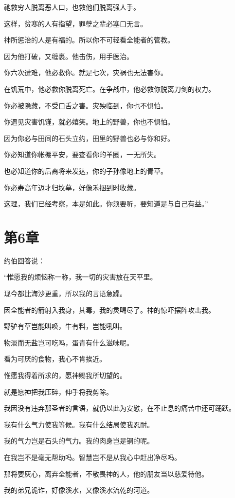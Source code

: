 \documentclass[12pt,oneside]{book}
\begin{document}
祂救穷人脱离恶人口，也救他们脱离强人手。

这样，贫寒的人有指望，罪孽之辈必塞口无言。

神所惩治的人是有福的。所以你不可轻看全能者的管教。

因为他打破，又缠裹。他击伤，用手医治。

你六次遭难，他必救你。就是七次，灾祸也无法害你。

在饥荒中，他必救你脱离死亡。在争战中，他必救你脱离刀剑的权力。

你必被隐藏，不受口舌之害。灾殃临到，你也不惧怕。

你遇见灾害饥馑，就必嬉笑。地上的野兽，你也不惧怕。

因为你必与田间的石头立约，田里的野兽也必与你和好。

你必知道你帐棚平安，要查看你的羊圈，一无所失。

也必知道你的后裔将来发达，你的子孙像地上的青草。

你必寿高年迈才归坟墓，好像禾捆到时收藏。

这理，我们已经考察，本是如此。你须要听，要知道是与自己有益。”



\chapter{第6章}
约伯回答说：

“惟愿我的烦恼称一称，我一切的灾害放在天平里。

现今都比海沙更重，所以我的言语急躁。

因全能者的箭射入我身，其毒，我的灵喝尽了。神的惊吓摆阵攻击我。

野驴有草岂能叫唤，牛有料，岂能吼叫。

物淡而无盐岂可吃吗，蛋青有什么滋味呢。

看为可厌的食物，我心不肯挨近。

惟愿我得着所求的，愿神赐我所切望的。

就是愿神把我压碎，伸手将我剪除。

我因没有违弃那圣者的言语，就仍以此为安慰，在不止息的痛苦中还可踊跃。

我有什么气力使我等候。我有什么结局使我忍耐。

我的气力岂是石头的气力。我的肉身岂是铜的呢。

在我岂不是毫无帮助吗。智慧岂不是从我心中赶出净尽吗。

那将要灰心，离弃全能者，不敬畏神的人，他的朋友当以慈爱待他。

我的弟兄诡诈，好像溪水，又像溪水流乾的河道。
\end{document}
